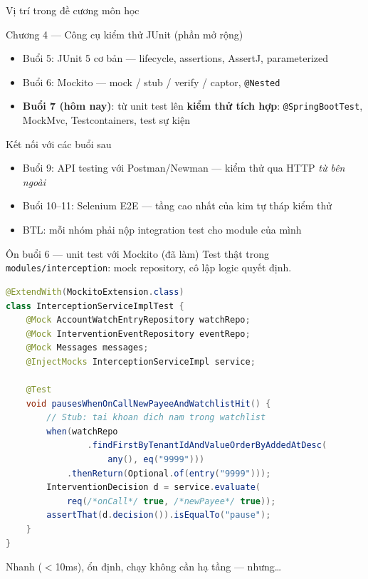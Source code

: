 \documentclass[aspectratio=169,12pt]{beamer}
\begin{document}
\begin{frame}{Vị trí trong đề cương môn học}
  \begin{block}{Chương 4 --- Công cụ kiểm thử JUnit (phần mở rộng)}
    \begin{itemize}
      \item Buổi 5: JUnit 5 cơ bản --- lifecycle, assertions, AssertJ, parameterized
      \item Buổi 6: Mockito --- mock / stub / verify / captor, \texttt{@Nested}
      \item \textbf{Buổi 7 (hôm nay)}: từ unit test lên \textbf{kiểm thử tích hợp}:
        \texttt{@SpringBootTest}, MockMvc, Testcontainers, test sự kiện
    \end{itemize}
  \end{block}
  \begin{exampleblock}{Kết nối với các buổi sau}
    \begin{itemize}
      \item Buổi 9: API testing với Postman/Newman --- kiểm thử qua HTTP \emph{từ bên ngoài}
      \item Buổi 10--11: Selenium E2E --- tầng cao nhất của kim tự tháp kiểm thử
      \item BTL: mỗi nhóm phải nộp integration test cho module của mình
    \end{itemize}
  \end{exampleblock}
\end{frame}

\begin{frame}[fragile]{Ôn buổi 6 --- unit test với Mockito (đã làm)}
  Test thật trong \texttt{modules/interception}: mock repository, cô lập logic quyết định.
\begin{lstlisting}[language=Java,style=code,basicstyle=\ttfamily\scriptsize,aboveskip=0pt]
@ExtendWith(MockitoExtension.class)
class InterceptionServiceImplTest {
    @Mock AccountWatchEntryRepository watchRepo;
    @Mock InterventionEventRepository eventRepo;
    @Mock Messages messages;
    @InjectMocks InterceptionServiceImpl service;

    @Test
    void pausesWhenOnCallNewPayeeAndWatchlistHit() {
        // Stub: tai khoan dich nam trong watchlist
        when(watchRepo
                .findFirstByTenantIdAndValueOrderByAddedAtDesc(
                    any(), eq("9999")))
            .thenReturn(Optional.of(entry("9999")));
        InterventionDecision d = service.evaluate(
            req(/*onCall*/ true, /*newPayee*/ true));
        assertThat(d.decision()).isEqualTo("pause");
    }
}
\end{lstlisting}
  Nhanh ($<$10ms), ổn định, chạy không cần hạ tầng --- nhưng\ldots
\end{frame}
\end{document}
